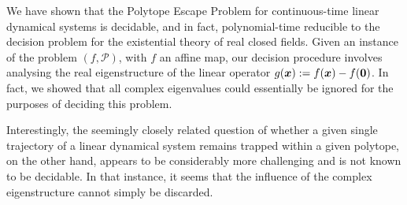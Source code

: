 We have shown that the Polytope Escape Problem for continuous-time
linear dynamical systems is decidable, and in fact, polynomial-time
reducible to the decision problem for the existential theory of real
closed fields.  Given an instance of the problem $(f,\mathcal{P})$,
with $f$ an affine map, our decision procedure involves analysing the real
eigenstructure of the linear operator
$g(\boldsymbol{x}):=f(\boldsymbol{x})-f(\boldsymbol{0})$. In fact, we
showed that all complex eigenvalues could essentially be ignored for
the purposes of deciding this problem.

Interestingly, the seemingly closely related question of whether a
given single trajectory of a linear dynamical system remains trapped
within a given polytope, on the other hand, appears to be
considerably more challenging and is not known to be decidable. In
that instance, it seems that the influence of the complex
eigenstructure cannot simply be discarded.

